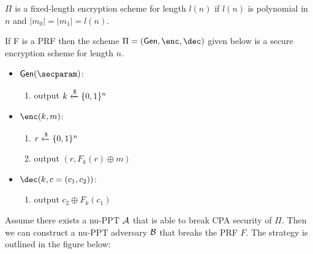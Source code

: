 $\Pi$ is a fixed-length encryption scheme for length $l(n)$ if $l(n)$ is polynomial in $n$ and $|m_0| = |m_1| = l(n)$.

\begin{theorem}
    If F is a PRF then the scheme $\Pi = (\gen, \enc, \dec)$ given below is a secure encryption scheme for length $n$.

    \begin{itemize}
        \item $\gen(\secparam)$:
        \begin{enumerate}
            \item output $k \xleftarrow{\$} \{0, 1\}^n$
        \end{enumerate}
        \item $\enc(k, m)$:
        \begin{enumerate}
            \item $r \xleftarrow{\$} \{0, 1\}^n$
            \item output $(r, F_k(r) \oplus m)$
        \end{enumerate}
        \item $\dec(k, c=(c_1, c_2))$:
        \begin{enumerate}
            \item output $c_2 \oplus F_k(c_1)$
        \end{enumerate}
    \end{itemize}
    
\end{theorem}

\proof
Assume there exists a nu-PPT $\mathcal{A}$ that is able to break CPA security of $\Pi$.
Then we can construct a nu-PPT adversary $\mathcal{B}$ that breaks the PRF $F$.
The strategy is outlined in the figure below:

